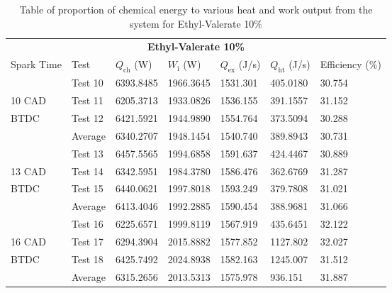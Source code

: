 \begin{table}[H]
    \begin{center}
        \begin{tabular}{@{}l l l l l l l@{}}
            \toprule
            \multicolumn{7}{c}{\textbf{Ethyl-Valerate 10\%}}                                                                                  \\
            Spark Time & Test    & $Q_\textrm{ch}$ (W) & $W_\textrm{i}$ (W) & $Q_\textrm{ex}$ (J/s) & $Q_\textrm{ht}$ (J/s) & Efficiency (\%) \\
            \midrule
                       & Test 10 & 6393.8485           & 1966.3645          & 1531.301              & 405.0180              & 30.754          \\
            10 CAD     & Test 11 & 6205.3713           & 1933.0826          & 1536.155              & 391.1557              & 31.152          \\
            BTDC       & Test 12 & 6421.5921           & 1944.9890          & 1554.764              & 373.5094              & 30.288          \\
                       & Average & 6340.2707           & 1948.1454          & 1540.740              & 389.8943              & 30.731          \\
                       & Test 13 & 6457.5565           & 1994.6858          & 1591.637              & 424.4467              & 30.889          \\
            13 CAD     & Test 14 & 6342.5951           & 1984.3780          & 1586.476              & 362.6769              & 31.287          \\
            BTDC       & Test 15 & 6440.0621           & 1997.8018          & 1593.249              & 379.7808              & 31.021          \\
                       & Average & 6413.4046           & 1992.2885          & 1590.454              & 388.9681              & 31.066          \\
                       & Test 16 & 6225.6571           & 1999.8119          & 1567.919              & 435.6451              & 32.122          \\
            16 CAD     & Test 17 & 6294.3904           & 2015.8882          & 1577.852              & 1127.802              & 32.027          \\
            BTDC       & Test 18 & 6425.7492           & 2024.8938          & 1582.163              & 1245.007              & 31.512          \\
                       & Average & 6315.2656           & 2013.5313          & 1575.978              & 936.151               & 31.887          \\
            \bottomrule
        \end{tabular}
        \caption{Table of proportion of chemical energy to various heat and work output from the system for Ethyl-Valerate 10\%}
        \label{q4-t2}
    \end{center}
\end{table}
